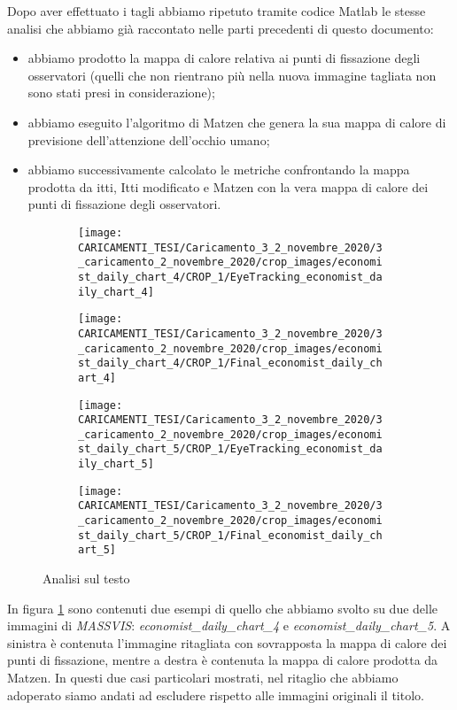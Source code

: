 \documentclass[%
	corpo=12pt,
    twoside,
    stile=classica,
    oldstyle,
    tipotesi=custom,
    greek,
    evenboxes,
]{toptesi}
\begin{document}
{Dopo aver effettuato i tagli abbiamo ripetuto tramite codice Matlab le stesse analisi che abbiamo già raccontato nelle parti precedenti di questo documento: 
\begin{itemize}
\item abbiamo prodotto la mappa di calore relativa ai punti di fissazione degli osservatori (quelli che non rientrano più nella nuova immagine tagliata non sono stati presi in considerazione);
\item abbiamo eseguito l'algoritmo di Matzen che genera la sua mappa di calore di previsione dell'attenzione dell'occhio umano;
\item abbiamo successivamente calcolato le metriche confrontando la mappa prodotta da itti, Itti modificato e Matzen con la vera mappa di calore dei punti di fissazione degli osservatori.
\end{itemize}
\begin{figure}[!htb]\centering
\begin{subfigure}
\centering
\texttt{[image: CARICAMENTI\_TESI/Caricamento\_3\_2\_novembre\_2020/3\_caricamento\_2\_novembre\_2020/crop\_images/economist\_daily\_chart\_4/CROP\_1/EyeTracking\_economist\_daily\_chart\_4]}
\end{subfigure}
\begin{subfigure}
\centering
\texttt{[image: CARICAMENTI\_TESI/Caricamento\_3\_2\_novembre\_2020/3\_caricamento\_2\_novembre\_2020/crop\_images/economist\_daily\_chart\_4/CROP\_1/Final\_economist\_daily\_chart\_4]}
\end{subfigure}
\begin{subfigure}
\centering
\texttt{[image: CARICAMENTI\_TESI/Caricamento\_3\_2\_novembre\_2020/3\_caricamento\_2\_novembre\_2020/crop\_images/economist\_daily\_chart\_5/CROP\_1/EyeTracking\_economist\_daily\_chart\_5]}
\end{subfigure}
\begin{subfigure}
\centering
\texttt{[image: CARICAMENTI\_TESI/Caricamento\_3\_2\_novembre\_2020/3\_caricamento\_2\_novembre\_2020/crop\_images/economist\_daily\_chart\_5/CROP\_1/Final\_economist\_daily\_chart\_5]}
\end{subfigure}
\caption{Analisi sul testo}\label{fig: Final_economist_daily_chart_4_CROP}
\end{figure}
In figura \ref{fig: Final_economist_daily_chart_4_CROP} sono contenuti due esempi di quello che abbiamo svolto su due delle immagini di \textit{MASSVIS}: \textit{economist\_daily\_chart\_4} e \textit{economist\_daily\_chart\_5}. A sinistra è contenuta l'immagine ritagliata con sovrapposta la mappa di calore dei punti di fissazione, mentre a destra è contenuta la mappa di calore prodotta da Matzen. In questi due casi particolari mostrati, nel ritaglio che abbiamo adoperato siamo andati ad escludere rispetto alle immagini originali il titolo. 

}
\end{document}
